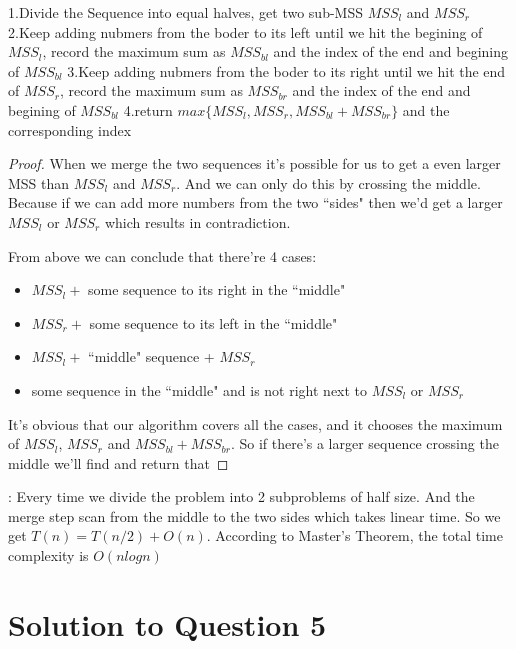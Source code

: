 \documentclass[11pt]{article}
\begin{document}

\begin{algorithm}
\begin{algorithmic}
  \State 1.Divide the Sequence into equal halves, get two sub-MSS $MSS_l$ and $MSS_r$
  \State 2.Keep adding nubmers from the boder to its left until we hit the begining of $MSS_l$, record the maximum sum as $MSS_{bl}$ and the index of the end and begining of $MSS_{bl}$
  \State 3.Keep adding nubmers from the boder to its right until we hit the end of $MSS_r$, record the maximum sum as $MSS_{br}$ and the index of the end and begining of $MSS_{bl}$
  \State 4.return $max\{MSS_l, MSS_r, MSS_{bl}+MSS_{br}\}$ and the corresponding index
\end{algorithmic}
\end{algorithm}

\begin{proof}
When we merge the two sequences it's possible for us to get a even larger MSS than $MSS_l$ and $MSS_r$. And we can only do this by crossing the middle. Because if we can add more numbers from the two ``sides" then we'd get a larger $MSS_l$ or $MSS_r$ which results in contradiction.

From above we can conclude that there're 4 cases:
\begin{itemize}
\item $MSS_l +$ some sequence to its right in the ``middle"
\item $MSS_r +$ some sequence to its left in the ``middle"
\item $MSS_l +$ ``middle" sequence + $MSS_r$
\item some sequence in the ``middle" and is not right next to $MSS_l$ or $MSS_r$
\end{itemize}

It's obvious that our algorithm covers all the cases, and it chooses the maximum of $MSS_l$, $MSS_r$ and $MSS_{bl}+MSS_{br}$. So if there's a larger sequence crossing the middle we'll find and return that

\end{proof}

: Every time we divide the problem into 2 subproblems of half size. And the merge step scan from the middle to the two sides which takes linear time. So we get $T(n) = T(n/2) + O(n)$. According to Master's Theorem, the total time complexity is $O(nlogn)$

\section{Solution to Question 5}
\end{document}
